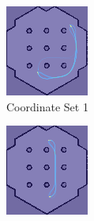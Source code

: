 \documentclass[%
paper=A4,               %
twoside=true,           %
openright,              %
11pt,                   %
bibliography=totoc,     %
titlepage=on,           %
DIV=12,                 %
BCOR=1.5cm,             %
parskip=half,            %
final
]{scrreprt}
\begin{document}
		\begin{figure}[H]
		\centering
		\begin{subfigure}[b]{0.45\textwidth}
			\centering
			\includegraphics[width=\textwidth]{Graphics/heatmapsim1.png}
			\caption{Coordinate Set 1}
			\label{fig:fig10}
		\end{subfigure}
		\hfill
		\begin{subfigure}[b]{0.45\textwidth}
			\centering
			\includegraphics[width=\textwidth]{Graphics/heatmapsim2.png}

\end{subfigure}
\end{figure}
\end{document}
